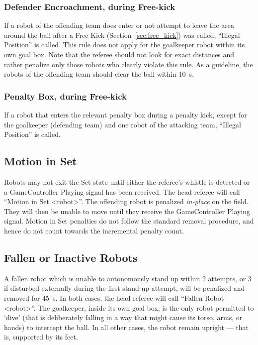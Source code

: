 \subsubsection{Defender Encroachment, during Free-kick}

If a robot of the offending team does enter or not attempt to leave the \FreeKickRadius area around the ball after a Free Kick (\cf Section~\ref{sec:free_kick}) was called, ``Illegal Position'' is called. This rule does not apply for the goalkeeper robot within its own goal box. Note that the referee should not look for exact distances and rather penalize only those robots who clearly violate this rule. As a guideline, the robots of the offending team should clear the ball within \qty{10}{\second}.

\subsubsection{Penalty Box, during Free-kick}

If a robot that enters the relevant penalty box during a penalty kick, except for the goalkeeper (defending team) and one robot of the attacking team, ``Illegal Position'' is called.

\subsection{Motion in Set}
\label{sec:motion_in_set}

Robots may not exit the Set state until either the referee's whistle is detected or a GameController Playing signal has been received.
The head referee will call ``Motion in Set \textless robot\textgreater''.
The offending robot is penalized \textit{in-place} on the field.  They will then be unable to move until they receive the GameController Playing signal.  Motion in Set penalties do not follow the standard removal procedure, and hence do not count towards the incremental penalty count.

\subsection{Fallen or Inactive Robots}
\label{sec:fallenrobots}

A fallen robot which is unable to autonomously stand up within 2 attempts, or 3 if disturbed externally during the first stand-up attempt, will be penalized and removed for \qty{45}{\second}.
In both cases, the head referee will call ``Fallen Robot  \textless robot\textgreater''.
The goalkeeper, inside its own goal box, is the only robot permitted to `dive' (that is deliberately falling in a way that might cause its torso, arms, or hands) to intercept the ball. In all other cases, the robot remain upright — that is, supported by its feet.

